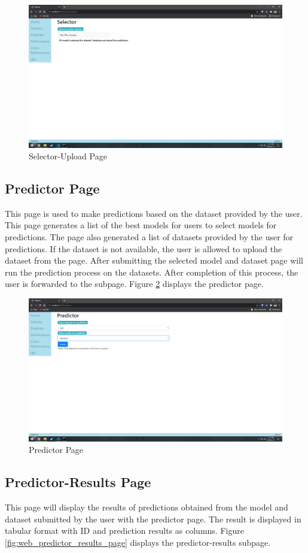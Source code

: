 \begin{figure}[H]
  \centering
  \includegraphics[width=0.7\columnwidth]{media/website/pages/02_selector_upload.png}
  \caption{Selector-Upload Page}
  \label{fig:web_selector_upload_page}
\end{figure}

\subsection{Predictor Page} \label{subsec:predictor_page}
This page is used to make predictions based on the dataset provided by the user. This page generates a list of the best models for users to select models for predictions. The page also generated a list of datasets provided by the user for predictions. If the dataset is not available, the user is allowed to upload the dataset from the page. After submitting the selected model and dataset page will run the prediction process on the datasets. After completion of this process, the user is forwarded to the subpage. Figure \ref{fig:web_predictor_page} displays the predictor page.

\begin{figure}[H]
  \centering
  \includegraphics[width=0.7\columnwidth]{media/website/pages/03_predictor.png}
  \caption{Predictor Page}
  \label{fig:web_predictor_page}
\end{figure}

\subsection{Predictor-Results Page} \label{subsec:predictor_result_page}
This page will display the results of predictions obtained from the model and dataset submitted by the user with the predictor page. The result is displayed in tabular format with ID and prediction results as columns. Figure \ref{fig:web_predictor_results_page} displays the predictor-results subpage.

